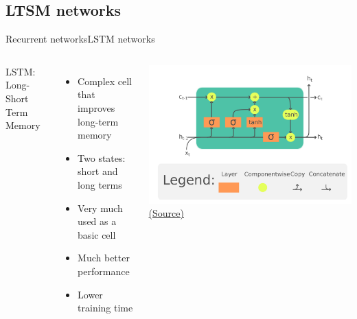 \documentclass[10pt,compress]{beamer} %
\begin{document}
\subsection{LTSM networks}
\begin{frame}{Recurrent networks}{LSTM networks}
    \begin{columns}
            LSTM: Long-Short Term Memory
            \begin{itemize}
                \item Complex cell that improves long-term memory
                \item Two states: short and long terms
                \item Very much used as a basic cell
                \item Much better performance
                \item Lower training time
            \end{itemize}
            \centering \includegraphics[width=\textwidth]{figs/LTSM.png}\\
	        \scriptsize\href{https://en.wikipedia.org/wiki/Long_short-term_memory}{(Source)}
    \end{columns}
\end{frame}

\end{document}
